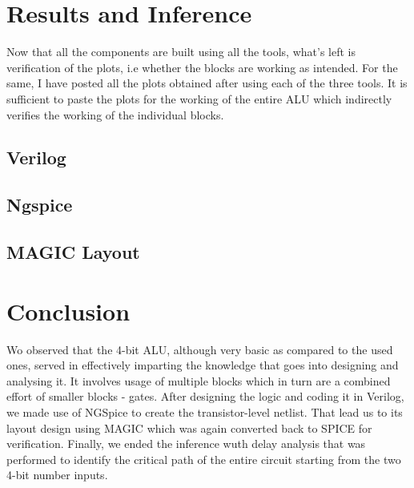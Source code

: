 \documentclass[a4paper, titlepage]{article}
\begin{document}
\section{Results and Inference}
Now that all the components are built using all the tools, what's left is verification of the plots, i.e whether 
the blocks are working as intended. For the same, I have posted all the plots obtained after using each of the three 
tools. It is sufficient to paste the plots for the working of the entire ALU which indirectly verifies the working 
of the individual blocks.
\subsection{Verilog}
\subsection{Ngspice}
\subsection{MAGIC Layout}

\section{Conclusion}
Wo observed that the 4-bit ALU, although very basic as compared to the used ones, served in effectively imparting the 
knowledge that goes into designing and analysing it. It involves usage of multiple blocks which in turn are a combined 
effort of smaller blocks - gates. After designing the logic and coding it in Verilog, we made use of NGSpice to
create the transistor-level netlist. That lead us to its layout design using MAGIC which was again converted back to SPICE
for verification. Finally, we ended the inference wuth delay analysis that was performed to identify the critical path of
the entire circuit starting from the two 4-bit number inputs.
\end{document}
